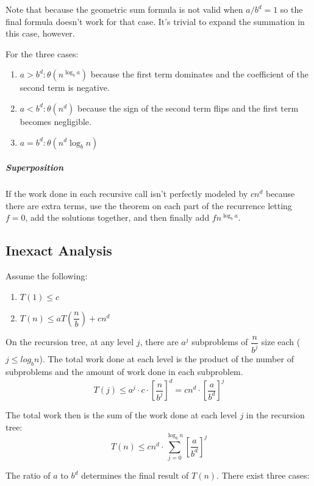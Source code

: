 \documentclass[11pt]{article}
\begin{document}
		Note that because the geometric sum formula is not valid when $a/b^d = 1$ so the final formula doesn't work for that case. It's trivial to expand the summation in this case, however.
		
		For the three cases:
		\begin{enumerate}
			\item $a > b^d: \theta(n^{\log_b a})$ because the first term dominates and the coefficient of the second term is negative.
			\item $a < b^d: \theta(n^d)$ because the sign of the second term flips and the first term becomes negligible.
			\item $a = b^d: \theta(n^d \log_b n)$
		\end{enumerate}
		
		\subparagraph{Superposition} If the work done in each recursive call isn't perfectly modeled by $cn^d$ because there are extra terms, use the theorem on each part of the recurrence letting $f=0$, add the solutions together, and then finally add $fn^{\log_b a}$.
		
	\subsection{Inexact Analysis}
		Assume the following:
		\begin{enumerate}
			\item $T(1)\leq c$
			\item $T(n)\leq aT\left(\dfrac{n}{b}\right) + cn^d$
		\end{enumerate}
		
		On the recursion tree, at any level $j$, there are $a^j$ subproblems of $\dfrac{n}{b^j}$ size each ($j\leq log_b n$). The total work done at each level is the product of the number of subproblems and the amount of work done in each subproblem.
		\begin{equation}
			T(j)\leq a^j\cdot c\cdot\left[\frac{n}{b^j}\right]^d = cn^d\cdot\left[\frac{a}{b^d}\right]^j
		\end{equation}
		
		The total work then is the sum of the work done at each level $j$ in the recursion tree:
		\begin{equation}
			T(n)\leq cn^d\cdot \sum_{j=0}^{\log_b n}\left[\frac{a}{b^d}\right]^j
		\end{equation}
		
		The ratio of $a$ to $b^d$ determines the final result of $T(n)$. There exist three cases:
		
\end{document}
